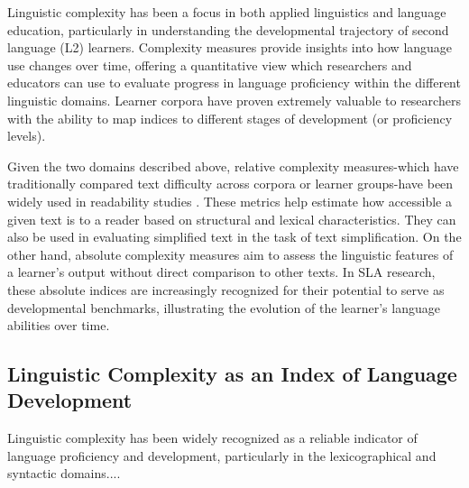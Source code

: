 
Linguistic complexity has been a focus in both applied linguistics and language education, particularly in
understanding the developmental trajectory of second language (L2) learners. Complexity measures provide insights
into how language use changes over time, offering a quantitative view which researchers and educators can use to
evaluate progress in language proficiency within the different linguistic domains. Learner corpora have proven
extremely valuable to
researchers with the ability to map indices to different stages of development (or proficiency levels).

Given the two domains described above, relative complexity measures-which have traditionally compared text difficulty
across corpora or learner groups-have been widely used in readability studies
\citep{shain2016, Feng2009, dellorletta2011, francois2012-ai,Berendes2018}. These metrics help estimate how accessible a
given
text is to a
reader
based on structural and lexical characteristics. They can also be used in evaluating simplified text in the task of
text simplification. On the other hand, absolute complexity measures aim to assess the linguistic features
of a learner's output without direct comparison to other texts. In SLA research, these absolute indices are
increasingly recognized for their potential to serve as developmental benchmarks, illustrating the evolution of the
learner's language abilities over time.

\subsection{Linguistic Complexity as an Index of Language Development}

Linguistic complexity has been widely recognized as a reliable indicator of language proficiency and development,
particularly in the lexicographical and syntactic domains....

